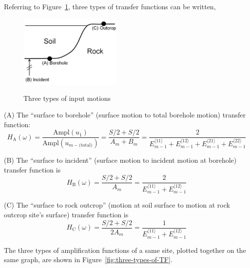 \documentclass[11pt,letterpaper]{article}
\newcommand{\f}[2]{\frac{#1}{#2}}
\newcommand{\la}{\langle}
\newcommand{\ra}{\rangle}
\begin{document}
Referring to Figure~\ref{fig:three-types-of-input-motions}, three types of transfer functions can be written,


\begin{figure}[h]
    \centering
  \includegraphics[width=0.45\textwidth]{three_motion_types.png}\\
  \caption{Three types of input motions}\label{fig:three-types-of-input-motions}
\end{figure}

\textsf{(A)} The ``surface to borehole'' (surface motion to total borehole motion) transfer function:
\begin{equation}
H_{\text{A}}(\omega)  = \displaystyle\frac{\text{Ampl}(u_1)}{\text{Ampl}(u_{m-\text{(total)}})} = \frac{S/2 + S/2}{A_m+B_m} = \frac{2}{E_{m-1}^{\la 11\ra} + E_{m-1}^{\la 12\ra}+E_{m-1}^{\la 21\ra} + E_{m-1}^{\la 22\ra}}
\end{equation}

\textsf{(B)} The ``surface to incident'' (surface motion to incident motion at borehole) transfer function is
\begin{equation}
H_{\text{B}}(\omega) = \f{S/2+S/2}{A_m} =\f{2}{E_{m-1}^{\la 11\ra} + E_{m-1}^{\la 12\ra}}
\end{equation}

\textsf{(C)} The ``surface to rock outcrop'' (motion at soil surface to motion at rock outcrop site's surface) transfer function is
\begin{equation}
H_{\text{C}}(\omega) = \f{S/2+S/2}{2A_m} = \f{1}{E_{m-1}^{\la 11\ra} + E_{m-1}^{\la 12\ra}}
\end{equation}

The three types of amplification functions of a same site, plotted together on the same graph, are shown in Figure~\ref{fig:three-types-of-TF}.
\end{document}
